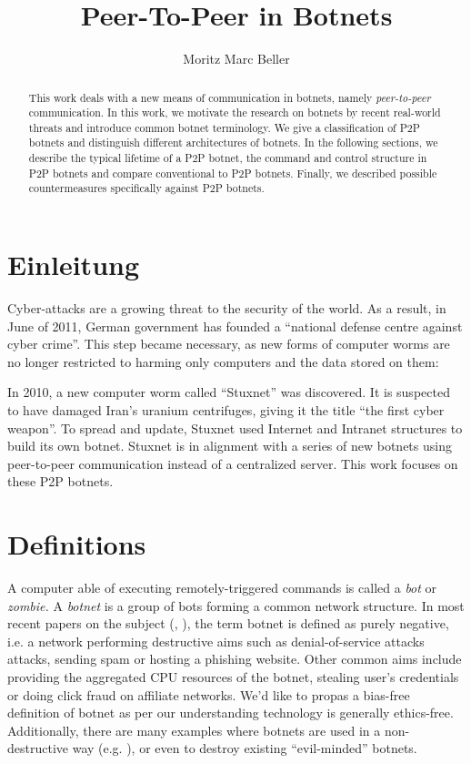 \documentclass{llncs}
\title{Peer-To-Peer in Botnets}
\author{Moritz Marc Beller}
\institute{%
   Fakultät für Informatik, \\
   Technische Universität München \\
   \email{\{beller\}@in.tum.de}
}
\begin{document}
\maketitle

\begin{abstract}
This work deals with a new means of communication in botnets, namely
{\it peer-to-peer} communication.  In this work, we motivate the research on botnets by recent real-world threats and introduce common botnet terminology. We give a classification of P2P botnets and distinguish different architectures of botnets. In the following sections, we describe the typical lifetime of a P2P botnet, the command and control structure in P2P botnets and compare conventional to P2P botnets. Finally, we described possible countermeasures specifically against P2P botnets.
\end{abstract}

\section{Einleitung}
Cyber-attacks are a growing threat to the security of the world. As a
result, in June of 2011, German government has founded a ``national
defense centre against cyber crime''.\cite{cyber} This step became
necessary, as new forms of computer worms are no longer restricted to
harming only computers and the data stored on them:

 In 2010, a new computer worm called ``Stuxnet'' was discovered. It is
 suspected to have damaged Iran's uranium centrifuges, giving it the
 title ``the first cyber weapon''\cite{benzin2011first}. To spread and
 update, Stuxnet used Internet and Intranet structures to build its
 own botnet.\cite{fallierew32} Stuxnet is in alignment with a series
 of new botnets using peer-to-peer communication instead of a
 centralized server. This work focuses on these P2P botnets.


\section{Definitions}
A computer able of executing remotely-triggered commands is called a
{\it bot} or {\it zombie.} A {\it botnet} is a group of bots forming a
common network structure.\cite{schoof2007detecting} In most recent
papers on the subject (\cite{wang2009systematic},
\cite{abu2006multifaceted}), the term botnet is defined as purely
negative, i.e. a network performing destructive aims such as
denial-of-service attacks attacks, sending spam or hosting a phishing
website\cite{steggink2007detection}. Other common aims include
providing the aggregated CPU resources of the botnet, stealing user's
credentials \cite{borgaonkar2010analysis} or doing click fraud on
affiliate networks\cite{clickFraud}. We'd like to propas a bias-free
definition of botnet as per our understanding technology is generally
ethics-free. Additionally, there are many examples where botnets are
used in a non-destructive way (e.g. \cite{seti}), or even to destroy
existing ``evil-minded'' botnets.
\end{document}
